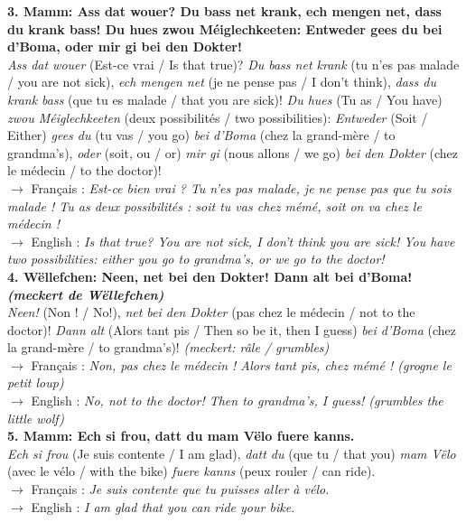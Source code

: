 \noindent\textbf{3. Mamm: Ass dat wouer? Du bass net krank, ech mengen net, dass du krank bass! Du hues zwou Méiglechkeeten: Entweder gees du bei d'Boma, oder mir gi bei den Dokter!}\\
\textit{Ass dat wouer} (Est-ce vrai / Is that true)? \textit{Du bass net krank} (tu n'es pas malade / you are not sick), \textit{ech mengen net} (je ne pense pas / I don't think), \textit{dass du krank bass} (que tu es malade / that you are sick)! \textit{Du hues} (Tu as / You have) \textit{zwou Méiglechkeeten} (deux possibilités / two possibilities): \textit{Entweder} (Soit / Either) \textit{gees du} (tu vas / you go) \textit{bei d'Boma} (chez la grand-mère / to grandma's), \textit{oder} (soit, ou / or) \textit{mir gi} (nous allons / we go) \textit{bei den Dokter} (chez le médecin / to the doctor)!\\
$\rightarrow$ Français : \textit{Est-ce bien vrai ? Tu n'es pas malade, je ne pense pas que tu sois malade ! Tu as deux possibilités : soit tu vas chez mémé, soit on va chez le médecin !}\\
$\rightarrow$ English : \textit{Is that true? You are not sick, I don't think you are sick! You have two possibilities: either you go to grandma's, or we go to the doctor!}\\[0.5em]

\noindent\textbf{4. Wëllefchen: Neen, net bei den Dokter! Dann alt bei d'Boma! \textit{(meckert de Wëllefchen)}}\\
\textit{Neen!} (Non ! / No!), \textit{net bei den Dokter} (pas chez le médecin / not to the doctor)! \textit{Dann alt} (Alors tant pis / Then so be it, then I guess) \textit{bei d'Boma} (chez la grand-mère / to grandma's)! \textit{(meckert: râle / grumbles)}\\
$\rightarrow$ Français : \textit{Non, pas chez le médecin ! Alors tant pis, chez mémé ! (grogne le petit loup)}\\
$\rightarrow$ English : \textit{No, not to the doctor! Then to grandma's, I guess! (grumbles the little wolf)}\\[0.5em]

\noindent\textbf{5. Mamm: Ech si frou, datt du mam Vëlo fuere kanns.}\\
\textit{Ech si frou} (Je suis contente / I am glad), \textit{datt du} (que tu / that you) \textit{mam Vëlo} (avec le vélo / with the bike) \textit{fuere kanns} (peux rouler / can ride).\\
$\rightarrow$ Français : \textit{Je suis contente que tu puisses aller à vélo.}\\
$\rightarrow$ English : \textit{I am glad that you can ride your bike.}\\[0.5em]

